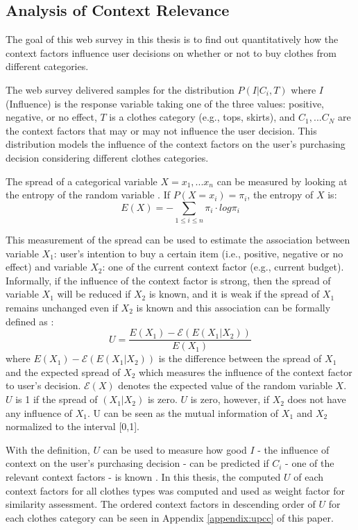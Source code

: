 \subsection{Analysis of Context Relevance} \label{sec:acr_acr}

The goal of this web survey in this thesis is to find out quantitatively how the context factors influence user decisions on whether or not to buy clothes from different categories. 

The web survey delivered samples for the distribution $P(I|C_i,T)$ where $I$ (Influence) is the response variable taking one of the three values: positive, negative, or no effect, $T$ is a clothes category (e.g., tops, skirts), and $C_1, ... C_N$ are the context factors that may or may not influence the user decision. This distribution models the influence of the context factors on the user's purchasing decision considering different clothes categories. 

The spread of a categorical variable $X={x_1, ... x_n}$ can be measured by looking at the entropy of the random variable \cite{ref:45}. If $P(X=x_i)=\pi_i$, the entropy of $X$ is: 
$$E(X)=-\sum_{1\leq i\leq n}\pi_i \cdot log{\pi_i} $$

This measurement of the spread can be used to estimate the association between variable $X_1$:  user's intention to buy a certain item (i.e., positive, negative or no effect) and variable $X_2$: one of the current context factor (e.g., current budget). Informally, if the influence of the context factor is strong, then the spread of variable $X_1$ will be reduced if $X_2$ is known, and it is weak if the spread of $X_1$ remains unchanged even if $X_2$ is known and this association can be formally defined as \cite{ref:18}:
$$U=\frac{E(X_1)-\mathcal{E}(E(X_1|X_2))}{E(X_1)}$$
where $E(X_1)-\mathcal{E}(E(X_1|X_2))$ is the difference between the spread of $X_1$ and the expected spread of $X_2$ which measures the influence of the context factor to user's decision. $\mathcal{E}(X)$ denotes the expected value of the random variable $X$. $U$ is 1 if the spread of $(X_1|X_2)$ is zero. $U$ is zero, however, if $X_2$ does not have any influence of $X_1$. U can be seen as the mutual information of $X_1$ and $X_2$ normalized to the interval [0,1]. 

With the definition, $U$ can be used to measure how good $I$ - the influence of context on the user's purchasing decision - can be predicted if $C_i$ - one of the relevant context factors - is known \cite{ref:18}. In this thesis, the computed $U$ of each context factors for all clothes types was computed and used as weight factor for similarity assessment. The ordered context factors in descending order of $U$ for each clothes category can be seen in Appendix \ref{appendix:upcc} of this paper.

